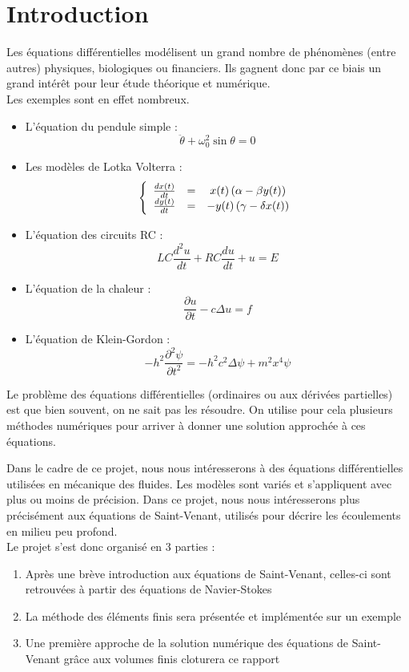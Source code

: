\chapter*{Introduction}

Les équations différentielles modélisent un grand nombre de phénomènes (entre autres) physiques, biologiques ou financiers. Ils gagnent donc par ce biais un grand intérêt pour leur étude théorique et numérique.\\
Les exemples sont en effet nombreux.
\begin{itemize}
	\item L'équation du pendule simple : \[\ddot{\theta}+ \omega_0^2\sin \theta=0\]
	\item Les modèles de Lotka Volterra : \[\left\{\begin{array}{c c c} \frac{dx(t)}{dt}&=&x(t)\left(\alpha-\beta y(t)\right)\\\frac{dy(t)}{dt} &=& -y(t)\left(\gamma-\delta x(t)\right)\end{array}\right.\]
	\item L'équation des circuits RC : \[LC\frac{d^2u}{dt}+RC\frac{du}{dt} +u = E\]
	\item L'équation de la chaleur : \[\frac{\partial u}{\partial t}-c\Delta u=f\]
	\item L'équation de Klein-Gordon : \[-h^2\frac{\partial^2 \psi}{\partial t^2} =-h^2c^2\Delta \psi +m^2x^4 \psi\]
\end{itemize}

Le problème des équations différentielles (ordinaires ou aux dérivées partielles) est que bien souvent, on ne sait pas les résoudre. On utilise pour cela plusieurs méthodes numériques pour arriver à donner une solution approchée à ces équations.

\bigskip
Dans le cadre de ce projet, nous nous intéresserons à des équations différentielles utilisées en mécanique des fluides. Les modèles sont variés et s'appliquent avec plus ou moins de précision. Dans ce projet, nous nous intéresserons plus précisément aux équations de Saint-Venant, utilisés pour décrire les écoulements en milieu peu profond.\\
Le projet s'est donc organisé en 3 parties :
\begin{enumerate}
	\item Après une brève introduction aux équations de Saint-Venant, celles-ci sont retrouvées à partir des équations de Navier-Stokes
	\item La méthode des éléments finis sera présentée et implémentée sur un exemple
	\item Une première approche de la solution numérique des équations de Saint-Venant grâce aux volumes finis cloturera ce rapport
\end{enumerate}
